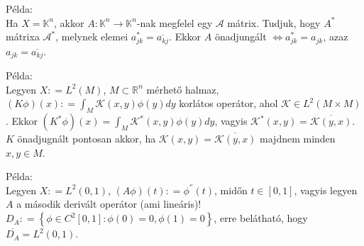 \documentclass[12pt,a4paper]{scrartcl}
\newenvironment{pelda}{}{}
\begin{document}
\begin{pelda}

Példa:\\
Ha \(X = {\mathbb{K}}^{n}\), akkor
\(\left. A:{\mathbb{K}}^{n}\rightarrow{\mathbb{K}}^{n} \right.\)-nak
megfelel egy \(\mathcal{A}\) mátrix. Tudjuk, hogy \(A^{*}\) mátrixa
\(\mathcal{A}^{*}\), melynek elemei \(a_{jk}^{*} = \overline{a_{kj}}\).
Ekkor \(A\) önadjungált
\(\left. \Leftrightarrow a_{jk}^{*} = a_{jk} \right.\), azaz
\(a_{jk} = \overline{a_{kj}}\).

\end{pelda}

\begin{pelda}

Példa:\\
Legyen \(X: = L^{2}\left( M \right)\), \(M \subset {\mathbb{R}}^{n}\)
mérhető halmaz,
\(\left( {K\phi} \right)\left( x \right): = {\int_{M}{\mathcal{K}\left( {x,y} \right)\phi\left( y \right)dy}}\)
korlátos operátor, ahol
\(\mathcal{K} \in L^{2}\left( {M \times M} \right)\). Ekkor
\(\left( {K^{*}\phi} \right)\left( x \right) = {\int_{M}{\mathcal{K}^{*}\left( {x,y} \right)\phi\left( y \right)dy}}\),
vagyis
\(\mathcal{K}^{*}\left( {x,y} \right) = \overline{\mathcal{K}\left( {y,x} \right)}\).
\(K\) önadjugnált pontosan akkor, ha
\(\mathcal{K}\left( {x,y} \right) = \overline{\mathcal{K}\left( {y,x} \right)}\)
majdnem minden \(x,y \in M\).

\end{pelda}

\begin{pelda}

Példa:\\
Legyen \(X: = L^{2}\left( 0,1 \right)\),
\(\left( {A\phi} \right)\left( t \right): = \phi^{''}\left( t \right)\),
midőn \(t \in \left\lbrack 0,1 \right\rbrack\), vagyis legyen \(A\) a
második derivált operátor (ami lineáris)!
\(D_{A}: = \left\{ {\phi \in C^{2}\left\lbrack 0,1 \right\rbrack:\phi\left( 0 \right) = 0,\phi\left( 1 \right) = 0} \right\}\),
erre belátható, hogy \(\overline{D_{A}} = L^{2}\left( 0,1 \right)\).

\end{pelda}
\end{document}
